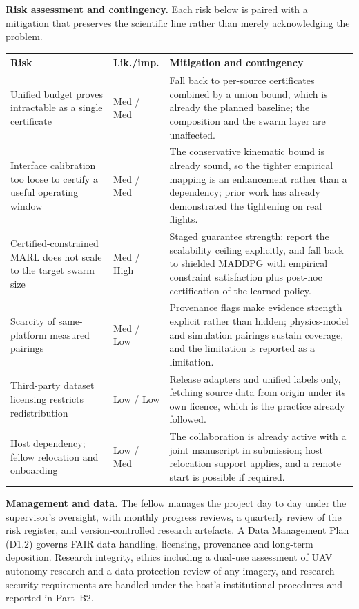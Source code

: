 \documentclass[11pt,a4paper]{article}
\begin{document}
\textbf{Risk assessment and contingency.} Each risk below is paired with a mitigation that preserves the scientific line rather than merely acknowledging the problem.
\begin{center}
\footnotesize
\begin{tabularx}{\linewidth}{@{}p{4.4cm}p{1.2cm}Y@{}}
\toprule
{}
\textbf{Risk} & \textbf{Lik./imp.} & \textbf{Mitigation and contingency} \\
\midrule
Unified budget proves intractable as a single certificate & Med / Med & Fall back to per-source certificates combined by a union bound, which is already the planned baseline; the composition and the swarm layer are unaffected. \\
Interface calibration too loose to certify a useful operating window & Med / Med & The conservative kinematic bound is already sound, so the tighter empirical mapping is an enhancement rather than a dependency; prior work has already demonstrated the tightening on real flights. \\
Certified-constrained MARL does not scale to the target swarm size & Med / High & Staged guarantee strength: report the scalability ceiling explicitly, and fall back to shielded MADDPG with empirical constraint satisfaction plus post-hoc certification of the learned policy. \\
Scarcity of same-platform measured pairings & Med / Low & Provenance flags make evidence strength explicit rather than hidden; physics-model and simulation pairings sustain coverage, and the limitation is reported as a limitation. \\
Third-party dataset licensing restricts redistribution & Low / Low & Release adapters and unified labels only, fetching source data from origin under its own licence, which is the practice already followed. \\
Host dependency; fellow relocation and onboarding & Low / Med & The collaboration is already active with a joint manuscript in submission; host relocation support applies, and a remote start is possible if required. \\
\bottomrule
\end{tabularx}
\end{center}

\textbf{Management and data.} The fellow manages the project day to day under the supervisor's oversight, with monthly progress reviews, a quarterly review of the risk register, and version-controlled research artefacts. A Data Management Plan (D1.2) governs FAIR data handling, licensing, provenance and long-term deposition. Research integrity, ethics including a dual-use assessment of UAV autonomy research and a data-protection review of any imagery, and research-security requirements are handled under the host's institutional procedures and reported in Part~B2.
\end{document}
